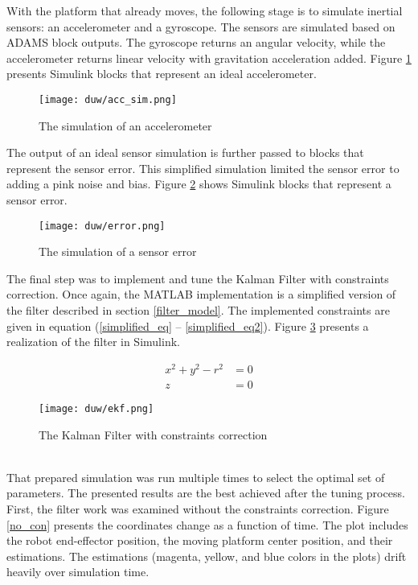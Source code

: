 With the platform that already moves, the following stage is to simulate inertial sensors: an accelerometer and a gyroscope. The sensors are simulated based on ADAMS block outputs. The gyroscope returns an angular velocity, while the accelerometer returns linear velocity with gravitation acceleration added. Figure \ref{acc_sym} presents Simulink blocks that represent an ideal accelerometer.

\begin{figure}[!h]
	\centering
	\texttt{[image: duw/acc\_sim.png]}
	\caption{The simulation of an accelerometer}
	\label{acc_sym}
\end{figure}

The output of an ideal sensor simulation is further passed to blocks that represent the sensor error. This simplified simulation limited the sensor error to adding a pink noise and bias. Figure \ref{error_sensor} shows Simulink blocks that represent a sensor error.

\begin{figure}[!h]
	\centering
	\texttt{[image: duw/error.png]}
	\caption{The simulation of a sensor error}
	\label{error_sensor}
\end{figure}

The final step was to implement and tune the Kalman Filter with constraints correction. Once again, the MATLAB implementation is a simplified version of the filter described in section \ref{filter_model}. The implemented constraints are given in equation (\ref{simplified_eq} -- \ref{simplified_eq2}). Figure \ref{ekf_sim} presents a realization of the filter in Simulink.

\begin{align}
	x^2 + y^2 - r^2 &= 0
	\label{simplified_eq}\\
	z &= 0
	\label{simplified_eq2}
\end{align}

\begin{figure}[!h]
	\centering
	\texttt{[image: duw/ekf.png]}
	\caption{The Kalman Filter with constraints correction}
	\label{ekf_sim}
\end{figure}
\ \\

That prepared simulation was run multiple times to select the optimal set of parameters. The presented results are the best achieved after the tuning process. First, the filter work was examined without the constraints correction. Figure \ref{no_con} presents the coordinates change as a function of time. The plot includes the robot end-effector position, the moving platform center position, and their estimations. The estimations (magenta, yellow, and blue colors in the plots) drift heavily over simulation time.\\

